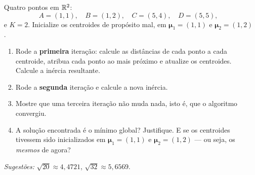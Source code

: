 \documentclass[11pt,a4paper]{article}
\begin{document}

\begin{exercicio}
Quatro pontos em $\mathbb{R}^2$:
\[
  A=(1,1), \quad B=(1,2), \quad C=(5,4), \quad D=(5,5),
\]
e $K=2$. Inicialize os centroides de propósito mal, em
$\bm\mu_1 = (1,1)$ e $\bm\mu_2=(1,2)$.
\begin{enumerate}[label=(\alph*),leftmargin=1.1cm]
  \item Rode a \textbf{primeira} iteração: calcule as distâncias de cada ponto a
        cada centroide, atribua cada ponto ao mais próximo e atualize os
        centroides. Calcule a inércia resultante.
  \item Rode a \textbf{segunda} iteração e calcule a nova inércia.
  \item Mostre que uma terceira iteração não muda nada, isto é, que o algoritmo
        convergiu.
  \item A solução encontrada é o mínimo global? Justifique. E se os centroides
        tivessem sido inicializados em $\bm\mu_1=(1,1)$ e $\bm\mu_2=(1{,}2)$
        --- ou seja, os \emph{mesmos} de agora?
\end{enumerate}
\emph{Sugestões:} $\sqrt{20}\approx 4{,}4721$, $\sqrt{32}\approx 5{,}6569$.
\end{exercicio}
\end{document}
